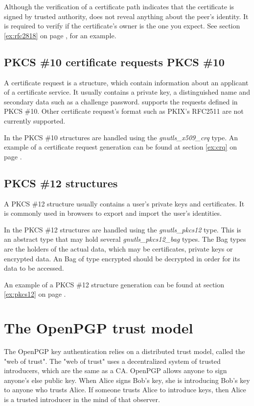 \par
Although the verification of a certificate path indicates that the
certificate is signed by trusted authority, does not reveal anything
about the peer's identity. It is required to verify if the certificate's
owner is the one you expect. See section \ref{ex:rfc2818} on page \pageref{ex:rfc2818},
for an example.


\subsection{PKCS \#10 certificate requests\index
{PKCS \#10}}
A certificate request is a structure, which
contain information about an applicant of a certificate service.
It usually contains a private key, a distinguished name and secondary
data such as a challenge password. \gnutls{} supports the requests
defined in PKCS \#10. Other certificate request's format such as
PKIX's RFC2511 are not currently supported.

In \gnutls{} the PKCS \#10 structures are handled using the
\emph{gnutls\_x509\_crq} type. 
An example of a certificate request generation can be found at section \ref{ex:crq}
on page \pageref{ex:crq}.

\subsection{PKCS \#12 structures}
A PKCS \#12 structure usually contains a user's private keys and
certificates. It is commonly used in browsers to export and import
the user's identities.
\par
In \gnutls{} the PKCS \#12 structures are handled using the
\emph{gnutls\_pkcs12} type. This is an abstract type that
may hold several \emph{gnutls\_pkcs12\_bag} types. The Bag types are the
holders of the actual data, which may be certificates, private
keys or encrypted data. An Bag of type encrypted should be decrypted
in order for its data to be accessed. 

An example of a PKCS \#12 structure generation can be found at section \ref{ex:pkcs12}
on page \pageref{ex:pkcs12}.

\section{The OpenPGP trust model}
\label{pgp:trust}

The OpenPGP key authentication relies on a distributed trust model, called
the "web of trust". The "web of trust" uses a decentralized system of 
trusted introducers, which are the same as a CA. OpenPGP allows anyone to 
sign anyone's else public key. When Alice signs Bob's key, she is introducing 
Bob's key to anyone who trusts Alice. If someone trusts Alice to introduce
keys, then Alice is a trusted introducer in the mind of that observer.

